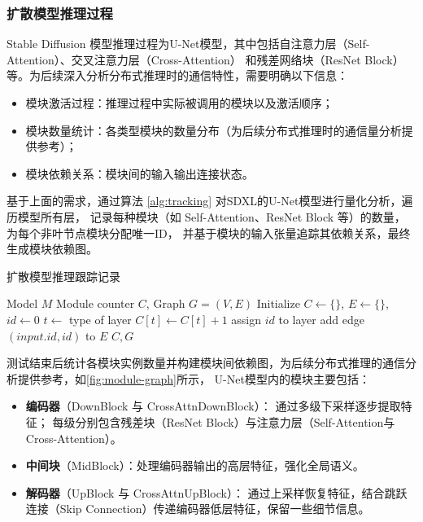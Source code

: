 \subsubsection{扩散模型推理过程}
\label{sec:diffusion_model_inference_process}
Stable Diffusion 模型推理过程为U-Net模型，其中包括自注意力层（Self-Attention）、交叉注意力层（Cross-Attention）
和残差网络块（ResNet Block）\cite{rombach2022high, Ronneberger2015UNetCN}等。为后续深入分析分布式推理时的通信特性，需要明确以下信息：
\begin{itemize}
    \item 模块激活过程：推理过程中实际被调用的模块以及激活顺序；
    \item 模块数量统计：各类型模块的数量分布（为后续分布式推理时的通信量分析提供参考）；
    \item 模块依赖关系：模块间的输入输出连接状态。
\end{itemize}
\par
基于上面的需求，通过算法 \ref{alg:tracking} 对SDXL\cite{Podell2023SDXLIL}的U-Net模型进行量化分析，遍历模型所有层，
记录每种模块（如 Self-Attention、ResNet Block 等）的数量，为每个非叶节点模块分配唯一ID，
并基于模块的输入张量追踪其依赖关系，最终生成模块依赖图。
\begin{algorithm}[!h]
    \caption{扩散模型推理跟踪记录}
    \label{alg:tracking}
    \renewcommand{\algorithmicrequire}{\textbf{Input:}}
    \renewcommand{\algorithmicensure}{\textbf{Output:}}
    \begin{algorithmic}[1]
        \REQUIRE Model $M$
        \ENSURE Module counter $C$, Graph $G = (V, E)$
        \STATE Initialize $C \leftarrow \{\}$, $E \leftarrow \{\}$, $id \leftarrow 0$
                \STATE $t \leftarrow$ type of layer
                \STATE $C[t] \leftarrow C[t] + 1$ 
                \STATE assign $id$ to layer
                    \STATE add edge $(input.id, id)$ to $E$
                \ENDFOR
            \ENDIF
        \ENDFOR
        \RETURN $C, G$
    \end{algorithmic}
\end{algorithm}
测试结束后统计各模块实例数量并构建模块间依赖图，为后续分布式推理的通信分析提供参考，如\autoref{fig:module-graph}所示，
U-Net模型内的模块主要包括：
\begin{itemize}
    \item \textbf{编码器}（DownBlock 与 CrossAttnDownBlock）：  
    通过多级下采样逐步提取特征；
    每级分别包含残差块（ResNet Block）与注意力层（Self-Attention与Cross-Attention）。
    \item \textbf{中间块}（MidBlock）：处理编码器输出的高层特征，强化全局语义。
    \item \textbf{解码器}（UpBlock 与 CrossAttnUpBlock）：  
    通过上采样恢复特征，结合跳跃连接（Skip Connection）传递编码器低层特征，保留一些细节信息\cite{Ronneberger2015UNetCN}。
\end{itemize}
